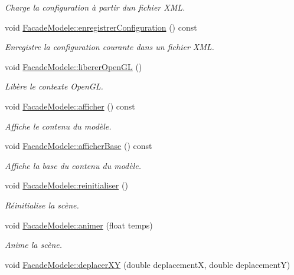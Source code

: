 \begin{DoxyCompactItemize}
\begin{DoxyCompactList}\small\item\em Charge la configuration à partir d\textquotesingle{}un fichier X\+M\+L. \end{DoxyCompactList}\item 
void \hyperlink{group__inf2990_ga277d8d9cea21e20fb366a0d48525f2c9}{Facade\+Modele\+::enregistrer\+Configuration} () const 
\begin{DoxyCompactList}\small\item\em Enregistre la configuration courante dans un fichier X\+M\+L. \end{DoxyCompactList}\item 
void \hyperlink{group__inf2990_gac7b831ce13626514e9637c4533d7c15d}{Facade\+Modele\+::liberer\+Open\+G\+L} ()
\begin{DoxyCompactList}\small\item\em Libère le contexte Open\+G\+L. \end{DoxyCompactList}\item 
void \hyperlink{group__inf2990_gac884e818dab5fe049a37b3f6f1c5d8c6}{Facade\+Modele\+::afficher} () const 
\begin{DoxyCompactList}\small\item\em Affiche le contenu du modèle. \end{DoxyCompactList}\item 
void \hyperlink{group__inf2990_ga23bed5e3b226e446cfee30084150f7f7}{Facade\+Modele\+::afficher\+Base} () const 
\begin{DoxyCompactList}\small\item\em Affiche la base du contenu du modèle. \end{DoxyCompactList}\item 
void \hyperlink{group__inf2990_ga4c2a991fe2297e44eeee0de111fb08d2}{Facade\+Modele\+::reinitialiser} ()
\begin{DoxyCompactList}\small\item\em Réinitialise la scène. \end{DoxyCompactList}\item 
void \hyperlink{group__inf2990_ga24dcb4e32cf104797158b398bafbfbb7}{Facade\+Modele\+::animer} (float temps)
\begin{DoxyCompactList}\small\item\em Anime la scène. \end{DoxyCompactList}\item 
void \hyperlink{group__inf2990_ga1d0468d14d18990c39861b22d4921a7c}{Facade\+Modele\+::deplacer\+X\+Y} (double deplacement\+X, double deplacement\+Y)

\end{DoxyCompactItemize}

